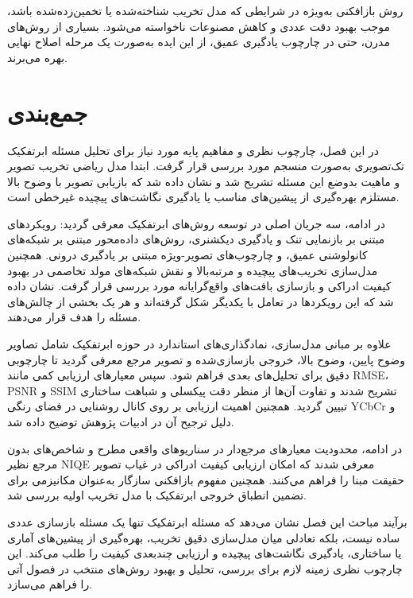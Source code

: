 روش بازافکنی به‌ویژه در شرایطی که مدل تخریب شناخته‌شده یا تخمین‌زده‌شده باشد، موجب بهبود دقت عددی و کاهش مصنوعات ناخواسته می‌شود. بسیاری از روش‌های مدرن، حتی در چارچوب یادگیری عمیق، از این ایده به‌صورت یک مرحله اصلاح نهایی بهره می‌برند.

\section{جمع‌بندی}

در این فصل، چارچوب نظری و مفاهیم پایه مورد نیاز برای تحلیل مسئله ابرتفکیک تک‌تصویری به‌صورت منسجم مورد بررسی قرار گرفت. ابتدا مدل ریاضی تخریب تصویر و ماهیت بدوضع این مسئله تشریح شد و نشان داده شد که بازیابی تصویر با وضوح بالا مستلزم بهره‌گیری از پیشین‌های مناسب یا یادگیری نگاشت‌های پیچیده غیرخطی است.

در ادامه، سه جریان اصلی در توسعه روش‌های ابرتفکیک معرفی گردید: رویکردهای مبتنی بر بازنمایی تنک و یادگیری دیکشنری، روش‌های داده‌محور مبتنی بر شبکه‌های کانولوشنی عمیق، و چارچوب‌های تصویر-ویژه مبتنی بر یادگیری درونی. همچنین مدل‌سازی تخریب‌های پیچیده و مرتبه‌بالا و نقش شبکه‌های مولد تخاصمی در بهبود کیفیت ادراکی و بازسازی بافت‌های واقع‌گرایانه مورد بررسی قرار گرفت. نشان داده شد که این رویکردها در تعامل با یکدیگر شکل گرفته‌اند و هر یک بخشی از چالش‌های مسئله را هدف قرار می‌دهند.

علاوه بر مبانی مدل‌سازی، نمادگذاری‌های استاندارد در حوزه ابرتفکیک شامل تصاویر وضوح پایین، وضوح بالا، خروجی بازسازی‌شده و تصویر مرجع معرفی گردید تا چارچوبی دقیق برای تحلیل‌های بعدی فراهم شود. سپس معیارهای ارزیابی کمی مانند RMSE، PSNR و SSIM تشریح شدند و تفاوت آن‌ها از منظر دقت پیکسلی و شباهت ساختاری تبیین گردید. همچنین اهمیت ارزیابی بر روی کانال روشنایی در فضای رنگی YCbCr و دلیل ترجیح آن در ادبیات پژوهش توضیح داده شد.

در ادامه، محدودیت معیارهای مرجع‌دار در سناریوهای واقعی مطرح و شاخص‌های بدون مرجع نظیر NIQE معرفی شدند که امکان ارزیابی کیفیت ادراکی در غیاب تصویر حقیقت مبنا را فراهم می‌کنند. همچنین مفهوم بازافکنی سازگار به‌عنوان مکانیزمی برای تضمین انطباق خروجی ابرتفکیک با مدل تخریب اولیه بررسی شد.

برآیند مباحث این فصل نشان می‌دهد که مسئله ابرتفکیک تنها یک مسئله بازسازی عددی ساده نیست، بلکه تعادلی میان مدل‌سازی دقیق تخریب، بهره‌گیری از پیشین‌های آماری یا ساختاری، یادگیری نگاشت‌های پیچیده و ارزیابی چندبعدی کیفیت را طلب می‌کند. این چارچوب نظری زمینه لازم برای بررسی، تحلیل و بهبود روش‌های منتخب در فصول آتی را فراهم می‌سازد.